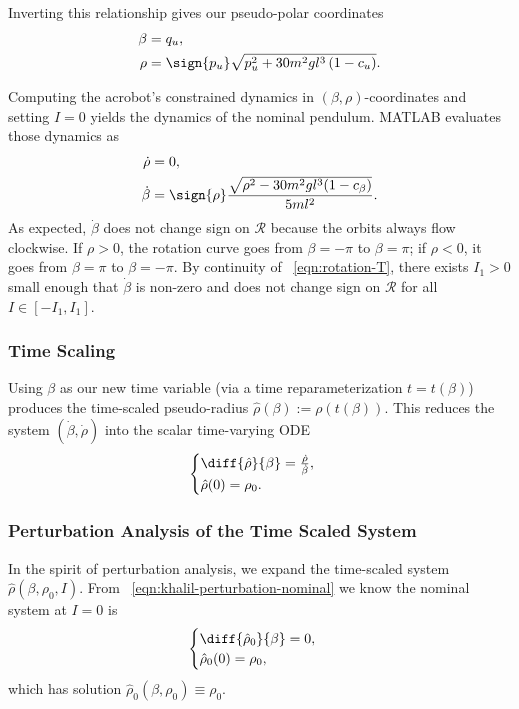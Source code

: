 Inverting this relationship gives our pseudo-polar coordinates
\begin{align}\label{eqn:rotation-T}
    \beta &= q_u
    , \\
    \rho &= \sign{p_u}\sqrt{p_u^2 + 30 m^2 g l^3 \left(1 - c_u \right)}
    .
\end{align}

Computing the acrobot's constrained dynamics in \((\beta,\rho)\)-coordinates and
setting \(I = 0\) yields the dynamics of the nominal pendulum.
MATLAB evaluates those dynamics as
\begin{align}\label{eqn:acrobot-rot-mu-dot-nom}
    \dot{\rho} &= 0
    , \\
    \label{eqn:acrobot-rot-alpha-dot-nom}
    \dot{\beta} &=  \sign{\rho} 
    \frac{\sqrt{\rho^2 - 30m^2gl^3(1 - c_\beta)}}{5ml^2}
    .
\end{align}
As expected, \(\dot{\beta}\) does not change sign on \(\mathcal{R}\) because the
orbits always flow clockwise.
If \(\rho > 0\), the rotation curve goes from \(\beta = -\pi\) to 
\(\beta = \pi\); 
if \(\rho < 0\), it goes from \(\beta = \pi\) to \(\beta = -\pi\).
By continuity of ~\eqref{eqn:rotation-T}, there exists \(I_1 > 0\) small enough
that \(\dot{\beta}\) is non-zero and does not change sign on \(\mathcal{R}\) for
all \(I \in [-I_1,I_1]\).

\subsubsection*{Time Scaling}

Using \(\beta\) as our new time variable (via a time reparameterization
\(t = t(\beta)\)) produces the time-scaled pseudo-radius
\(\hat{\rho}(\beta) := \rho(t(\beta))\).
This reduces the system \((\dot{\beta},\dot{\rho})\) into the scalar time-varying
ODE
\begin{equation}\label{eqn:rhohat-dot}
    \begin{cases}
        \diff{\hat{\rho}}{\beta} = \frac{\dot{\rho}}{\dot{\beta}}
        , \\
        \hat{\rho}(0) = \rho_0
        .
    \end{cases}
\end{equation}

\subsubsection*{Perturbation Analysis of the Time Scaled System}

In the spirit of perturbation analysis, we expand the time-scaled system 
\(\hat{\rho}(\beta,\rho_0,I)\). 
From ~\eqref{eqn:khalil-perturbation-nominal} we know the nominal system at
\(I = 0\) is
\[
    \begin{cases} 
        \diff{\hat{\rho}_0}{\beta} = 0
        , \\
        \hat{\rho}_0(0) = \rho_0
        ,
    \end{cases}
\]
which has solution \(\hat{\rho}_0(\beta,\rho_0) \equiv \rho_0\).

